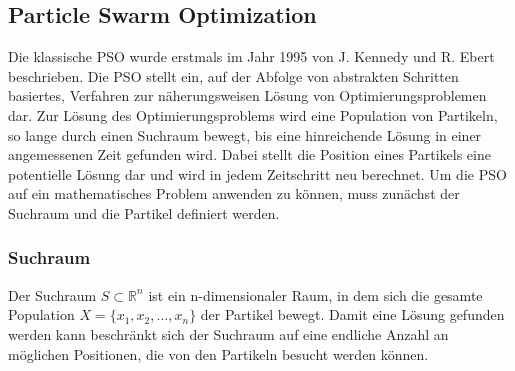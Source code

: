 \documentclass[a4paper, 11pt]{article}
\begin{document}
\subsection{Particle Swarm Optimization}
Die klassische \ac{PSO} wurde erstmals im Jahr 1995 von J. Kennedy und R. Ebert beschrieben. Die \acs{PSO} stellt ein, auf der Abfolge von abstrakten Schritten basiertes, Verfahren zur näherungsweisen Lösung von Optimierungsproblemen dar. Zur Lösung des Optimierungsproblems wird eine Population von Partikeln, so lange durch einen Suchraum bewegt, bis eine hinreichende Lösung in einer angemessenen Zeit gefunden wird. Dabei stellt die Position eines Partikels eine potentielle Lösung dar und wird in jedem Zeitschritt neu berechnet. Um die \acs{PSO} auf ein mathematisches Problem anwenden zu können, muss zunächst der Suchraum und die Partikel definiert werden.
\subsubsection{Suchraum}
Der Suchraum $S \subset \mathbb{R}^n$ ist ein n-dimensionaler Raum, in dem sich die gesamte Population $X=\{x_{1},x_{2},...,x_{n}\}$ der Partikel bewegt. Damit eine Lösung gefunden werden kann beschränkt sich der Suchraum auf eine endliche Anzahl an möglichen Positionen, die von den Partikeln besucht werden können.
\end{document}
